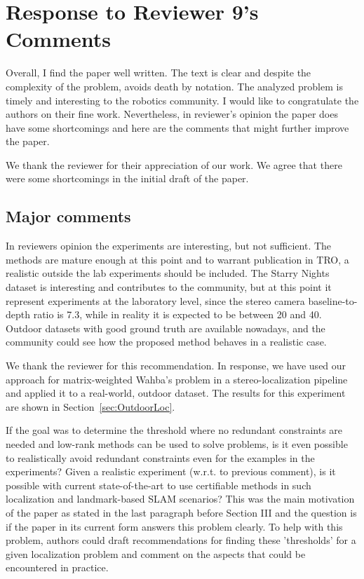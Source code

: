 \section*{Response to Reviewer 9's Comments}

Overall, I find the paper well written. The text is clear and despite the complexity of the problem, avoids death by notation. The analyzed problem is timely and interesting to the robotics community. I would like to congratulate the authors on their fine work. Nevertheless, in reviewer's opinion the paper does have some shortcomings and here are the comments that might further improve the paper. 

\begin{response}
We thank the reviewer for their appreciation of our work. We agree that there were some shortcomings in the initial draft of the paper. 
\end{response}

\subsection*{Major comments}

In reviewers opinion the experiments are interesting, but not sufficient. The methods are mature enough at this point and to warrant publication in TRO, a realistic outside the lab experiments should be included. The Starry Nights dataset is interesting and contributes to the community, but at this point it represent experiments at the laboratory level, since the stereo camera baseline-to-depth ratio is 7.3, while in reality it is expected to be between 20 and 40. Outdoor datasets  with good ground truth are available nowadays, and the community could see how the proposed method behaves in a realistic case. 

\begin{response}
    We thank the reviewer for this recommendation. In response, we have used our approach for matrix-weighted Wahba's problem in a stereo-localization pipeline and applied it to a real-world, outdoor dataset. The results for this experiment are shown in Section~\ref{sec:OutdoorLoc}. 
\end{response}

If the goal was to determine the threshold where no redundant constraints are needed and low-rank methods can be used to solve problems, is it even possible to realistically avoid redundant constraints even for the examples in the experiments? Given a realistic experiment (w.r.t. to previous comment), is it possible with current state-of-the-art to use certifiable methods in such localization and landmark-based SLAM scenarios? This was the main motivation of the paper as stated in the last paragraph before Section III and the question is if the paper in its current form answers this problem clearly. To help with this problem, authors could draft recommendations for finding these 'thresholds' for a given localization problem and comment on the aspects that could be encountered in practice. 

